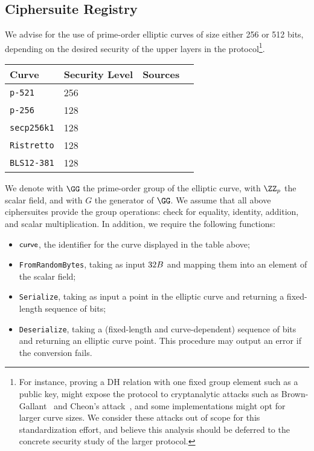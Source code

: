\documentclass[11pt]{article}
\begin{document}


\subsection{Ciphersuite Registry}
 We advise for the use of prime-order elliptic curves of size either 256 or 512 bits, depending on the desired security of the upper layers in the protocol\footnote{For instance, proving a DH relation with one fixed group element such as a public key, might expose the protocol to cryptanalytic attacks such as Brown-Gallant~\cite{EPRINT:BroGal04} and Cheon’s attack~\cite{EC:Cheon06}, and some implementations might opt for larger curve sizes. We consider these attacks out of scope for this standardization effort, and believe this analysis should be deferred to the concrete security study of the larger protocol.}.

 \vspace{1em}
 \begin{center}
 \begin{tabular}{llcc}
  \hline
  Curve  & Security Level & Sources \\
  \hline
  \verb|p-521|     & 256& \cite{fips2} \\
  \verb|p-256|     & 128 & \cite{fips2}  \\
  \verb|secp256k1| & 128 & \cite{SECG} \\
  \verb|Ristretto| & 128 & \cite{cfrg-ristretto-decaf} \\
  \verb|BLS12-381| & 128 & \cite{bls12} \\
 \end{tabular}
\end{center}
We denote with $\GG$ the prime-order group of the elliptic curve, with $\ZZ_p$ the scalar field, and with $G$ the generator of $\GG$.
We assume that all above ciphersuites provide the group operations: check for equality, identity, addition, and scalar multiplication.
In addition, we require the following functions:

\begin{itemize}
  \item $\textsf{curve}$, the identifier for the curve displayed in the table above;
  \item \texttt{FromRandomBytes}, taking as input $32B$ and mapping them into an element of the scalar field;
  \item \texttt{Serialize}, taking as input a point in the elliptic curve and returning a fixed-length sequence of bits;
  \item \texttt{Deserialize}, taking a (fixed-length and curve-dependent) sequence of bits and returning an elliptic curve point. This procedure may output an error if the conversion fails.
\end{itemize}
\end{document}
